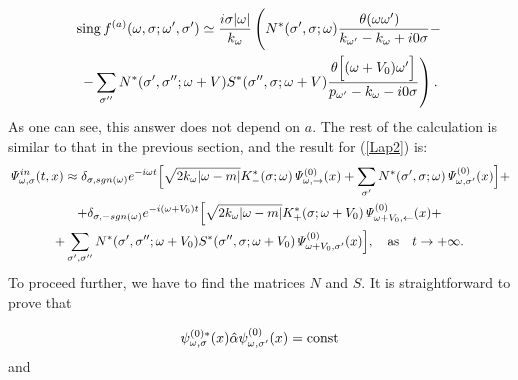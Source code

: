 \documentclass[12pt]{article}
\numberwithin{equation}{section}
\begin{document}
\begin{gather}
{\rm sing} \, f^{(a)}(\omega,\sigma;\omega',\sigma')\simeq \frac{i\sigma|\omega|}{k_\omega}\left(N^*(\sigma',\sigma;\omega)\frac{\theta(\omega \omega')^{\phantom{\frac12}}}{k_{\omega'} - k_\omega + i0\sigma} -\right. \nonumber \\ \left. -\sum_{\sigma''}N^*(\sigma',\sigma'';\omega+V)S^*(\sigma'',\sigma;\omega+V)\frac{\theta\Big[(\omega+V_0)\omega'\Big]}{p_{\omega'}-k_\omega -i0\sigma}\right).
\end{gather}
As one can see, this answer does not depend on $a$. The rest of the calculation is similar to that in the previous section, and the result for (\ref{Lap2}) is:
\begin{gather}
\mathit{\Psi}^{in}_{\omega,\sigma}(t,x)\approx\delta_{\sigma,sgn(\omega)}e^{-i\omega t}\Big[\sqrt{2 k _\omega |\omega-m|}K^*_{-}(\sigma;\omega)\mathit{\Psi}^{(0)}_{\omega,\rightarrow}(x)+\sum_{\sigma'}N^*(\sigma',\sigma;\omega)\mathit{\Psi}^{(0)}_{\omega,\sigma'}(x)\Big]+\nonumber\\
+\delta_{\sigma,-sgn(\omega)}e^{-i(\omega+V_0)t}\Big[\sqrt{2 k_\omega |\omega-m|} K^*_{+}(\sigma;\omega+V_0)\mathit{\Psi}^{(0)}_{\omega+V_0,\leftarrow}(x) + \nonumber \\ + \sum_{\sigma',\sigma''}N^*(\sigma',\sigma'';\omega+V_0)S^*(\sigma'',\sigma;\omega+V_0)\mathit{\Psi}^{(0)}_{\omega+V_0,\sigma'}(x)\Big], \quad {\rm as} \quad t \to +\infty.
\end{gather}
To proceed further, we have to find the matrices $N$ and $S$. It is straightforward to prove that

$$\mathit{\psi}^{(0)*}_{\omega,\sigma}(x)\hat{\alpha}\mathit{\psi}^{(0)}_{\omega,\sigma'}(x) = {\rm const}$$
and 
\end{document}
